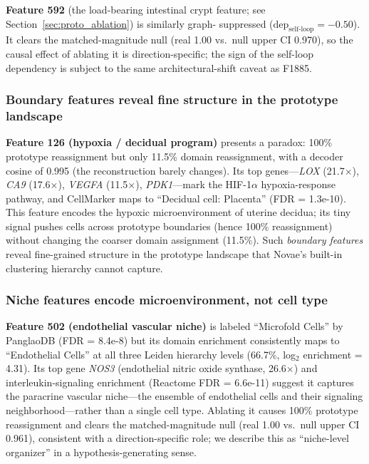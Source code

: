 \documentclass[11pt]{article}
\begin{document}
\textbf{Feature 592} (the load-bearing intestinal crypt feature; see
Section~\ref{sec:proto_ablation}) is similarly graph-
suppressed ($\text{dep}_\text{self-loop} = -0.50$). It clears the
matched-magnitude null (real 1.00 vs.\ null upper CI 0.970), so the
causal effect of ablating it is direction-specific; the sign of the
self-loop dependency is subject to the same architectural-shift
caveat as F1885.

\subsubsection{Boundary features reveal fine structure in the prototype landscape}

\textbf{Feature 126 (hypoxia / decidual program)} presents a paradox:
100\% prototype reassignment but only 11.5\% domain reassignment,
with a decoder cosine of 0.995 (the reconstruction barely changes).
Its top genes---\emph{LOX} (21.7$\times$), \emph{CA9} (17.6$\times$),
\emph{VEGFA} (11.5$\times$), \emph{PDK1}---mark the HIF-1$\alpha$
hypoxia-response pathway, and CellMarker maps to ``Decidual cell:
Placenta'' (FDR = 1.3e-10). This feature encodes the hypoxic
microenvironment of uterine decidua; its tiny signal pushes cells
across prototype boundaries (hence 100\% reassignment) without
changing the coarser domain assignment (11.5\%). Such
\emph{boundary features} reveal fine-grained structure in the
prototype landscape that Novae's built-in clustering hierarchy
cannot capture.

\subsubsection{Niche features encode microenvironment, not cell type}

\textbf{Feature 502 (endothelial vascular niche)} is labeled
``Microfold Cells'' by PanglaoDB (FDR = 8.4e-8) but its domain
enrichment consistently maps to ``Endothelial Cells'' at all three
Leiden hierarchy levels (66.7\%, log$_2$ enrichment = 4.31). Its top
gene \emph{NOS3} (endothelial nitric oxide synthase, 26.6$\times$)
and interleukin-signaling enrichment (Reactome FDR = 6.6e-11)
suggest it captures the paracrine vascular niche---the ensemble of
endothelial cells and their signaling neighborhood---rather than a
single cell type. Ablating it causes 100\% prototype reassignment and
clears the matched-magnitude null (real 1.00 vs.\ null upper CI 0.961),
consistent with a direction-specific role; we describe this as
``niche-level organizer'' in a hypothesis-generating sense.
\end{document}
